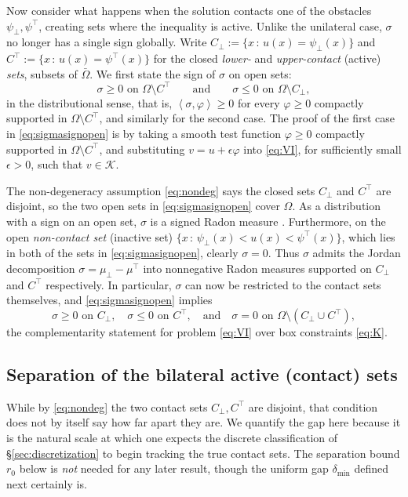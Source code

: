 \documentclass[12pt]{amsart}
\numberwithin{equation}{section}
\theoremstyle{plain}
\theoremstyle{definition}
\theoremstyle{remark}
\newcommand{\eps}{\epsilon}
\newcommand{\Om}{\Omega}
\newcommand{\psilo}{\psi_\bot}
\newcommand{\psiup}{\psi^\top}
\newcommand{\Cbot}{C_\bot}
\newcommand{\Ctop}{C^\top}
\begin{document}
Now consider what happens when the solution contacts one of the obstacles $\psilo,\psiup$, creating sets where the inequality is active.  Unlike the unilateral case, $\sigma$ no longer has a single sign globally.  Write $\Cbot := \{x\,:\,u(x) = \psilo(x)\}$ and $\Ctop := \{x\,:\,u(x) = \psiup(x)\}$ for the closed
\emph{lower-} and \emph{upper-contact} (active) \emph{sets}, subsets of $\bar\Om$.  We first state the sign of $\sigma$ on open sets:
\begin{equation}
\label{eq:sigmasignopen}
  \sigma \ge 0 \text{ on } \Om \setminus \Ctop \qquad \text{and} \qquad \sigma \le 0 \text{ on } \Om \setminus \Cbot,
\end{equation}
in the distributional sense, that is, $\left<\sigma,\varphi\right> \ge 0$ for every $\varphi \ge 0$ compactly supported in $\Om \setminus \Ctop$, and similarly for the second case.  The proof of the first case in \eqref{eq:sigmasignopen} is by taking a smooth test function $\varphi\ge 0$ compactly supported in $\Om \setminus \Ctop$, and substituting $v=u+\eps \varphi$ into \eqref{eq:VI}, for sufficiently small $\eps>0$, such that $v\in\mathcal{K}$.

The non-degeneracy assumption \eqref{eq:nondeg} says the closed sets $\Cbot$ and $\Ctop$ are disjoint, so the two open sets in \eqref{eq:sigmasignopen} cover $\Om$.  As a distribution with a sign on an open set, $\sigma$ is a signed Radon measure \cite{EvansGariepy2015}.  Furthermore, on the open \emph{non-contact set} (inactive set) $\{x\,:\,\psilo(x) < u(x) < \psiup(x)\}$, which lies in both of the sets in \eqref{eq:sigmasignopen}, clearly $\sigma = 0$.  Thus $\sigma$ admits the Jordan decomposition $\sigma = \mu_{\bot} - \mu^{\top}$ into nonnegative Radon measures supported on $\Cbot$ and $\Ctop$ respectively.  In particular, $\sigma$ can now be restricted to the contact sets themselves, and \eqref{eq:sigmasignopen} implies
\begin{equation}
\label{eq:sigmasign}
  \sigma \ge 0 \text{ on } \Cbot, \quad \sigma \le 0 \text{ on } \Ctop, \quad \text{and} \quad \sigma=0 \text{ on } \Om\setminus(\Cbot\cup\Ctop),
\end{equation}
the complementarity statement for problem \eqref{eq:VI} over box constraints \eqref{eq:K}.


\subsection{Separation of the bilateral active (contact) sets}  While by \eqref{eq:nondeg} the two contact sets $\Cbot, \Ctop$ are disjoint, that condition does not by itself say how far apart they are.  We quantify the gap here because it is the natural scale at which one expects the discrete classification of \S \ref{sec:discretization} to begin tracking the true contact sets.  The separation bound $r_0$ below is \emph{not} needed for any later result, though the uniform gap $\delta_{\min}$ defined next certainly is.
\end{document}
